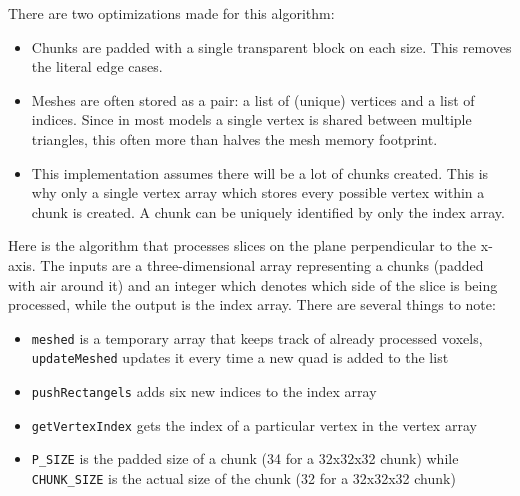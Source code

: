 \documentclass[times, utf8, zavrsni, numeric]{fer}
\begin{document}
There are two optimizations made for this algorithm:
\begin{itemize}
	\item Chunks are padded with a single transparent block on each size. This removes the literal edge cases.
	\item Meshes are often stored as a pair: a list of (unique) vertices and a list of indices. Since in most models a single vertex is shared between multiple triangles, this often more than halves the mesh memory footprint.
	\item This implementation assumes there will be a lot of chunks created. This is why only a single vertex array which stores every possible vertex within a chunk is created. A chunk can be uniquely identified by only the index array.
\end{itemize}

Here is the algorithm that processes slices on the plane perpendicular to the x-axis. The inputs are a three-dimensional array representing a chunks (padded with air around it) and an integer which denotes which side of the slice is being processed, while the output is the index array. There are several things to note:
\begin{itemize}
	\item \texttt{meshed} is a temporary array that keeps track of already processed voxels, \texttt{updateMeshed} updates it every time a new quad is added to the list
	\item \texttt{pushRectangels} adds six new indices to the index array
	\item \texttt{getVertexIndex} gets the index of a particular vertex in the vertex array
	\item \texttt{P\_SIZE} is the padded size of a chunk (34 for a 32x32x32 chunk) while \texttt{CHUNK\_SIZE} is the actual size of the chunk (32 for a 32x32x32 chunk)
\end{itemize}
\end{document}
